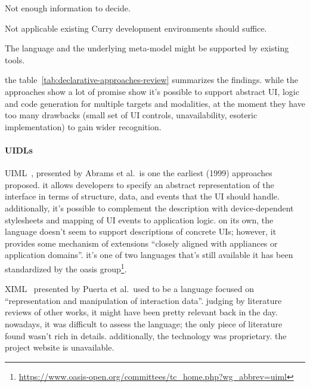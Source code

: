 \begin{table}[]
\begin{threeparttable}[b]
\begin{tabularx}{\textwidth}{lrCCC}
            \bottomrule
        \end{tabularx}
        \begin{tablenotes}
            \item [1] Not enough information to decide.
            \item [2] Not applicable\,\textemdash\,existing Curry development environments should suffice.
            \item [3] The language and the underlying meta-model might be supported by existing tools.
        \end{tablenotes}
    \end{threeparttable}
\end{table}

the table~\ref{tab:declarative-approaches-review} summarizes the findings.
while the approaches show a lot of promise\,\textemdash\,show it's possible to support abstract UI, logic and code generation for multiple targets and modalities, at the moment they have too many drawbacks (small set of UI controls, unavailability, esoteric implementation) to gain wider recognition.

\paragraph{UIDLs}

UIML~\cite{Abrams1999-ei}, presented by Abrams et al.\ is one the earliest (1999) approaches proposed.
it allows developers to specify an abstract representation of the interface in terms of structure, data, and events that the UI should handle.
additionally, it's possible to complement the description with device-dependent stylesheets and mapping of UI events to application logic.
on its own, the language doesn't seem to support descriptions of concrete UIs;
however, it provides some mechanism of extensions \enquote{closely aligned with appliances or application domains}.
it's one of two languages that's still available\,\textemdash\,it has been standardized by the oasis group\footnote{\url{https://www.oasis-open.org/committees/tc_home.php?wg_abbrev=uiml}}.

XIML~\cite{puerta2001ximl} presented by Puerta et al.\ used to be a language focused on \enquote{representation and manipulation of interaction data}.
judging by literature reviews of other works, it might have been pretty relevant back in the day.
nowadays, it was difficult to assess the language;
the only piece of literature found wasn't rich in details.
additionally, the technology was proprietary.
the project website is unavailable.

